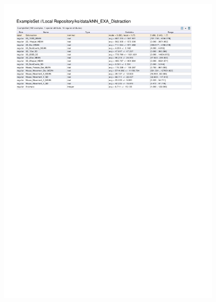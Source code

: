 \begin{figure}[htp]
  \centerline{\includegraphics[trim=0 580 0 60,clip,width=16.09cm]{results/kNN_EXA_Distraction.pdf}} \caption{
} \label{kNN_EXA_Distraction}
\end{figure}

